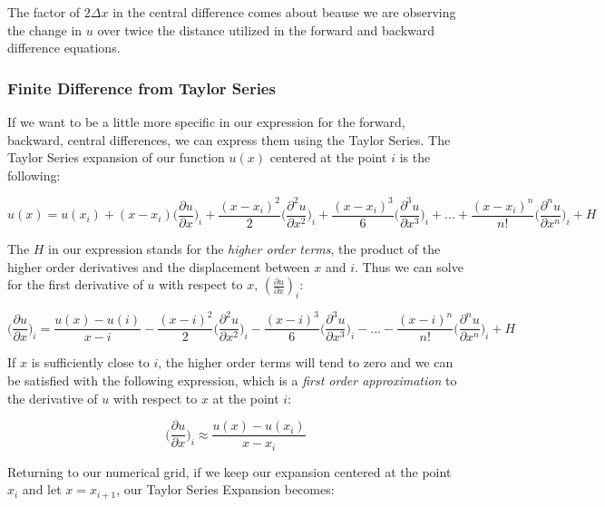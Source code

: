 \documentclass[twocolumn,12pth]{article}
\begin{document}
The factor of $2\Delta{x}$ in the central difference comes about beause we are observing the change in $u$ over twice the distance utilized in the forward and backward difference equations.

\subsubsection{Finite Difference from Taylor Series}
If we want to be a little more specific in our expression for the forward, backward, central differences, we can express them using the Taylor Series.
The Taylor Series expansion of our function $u(x)$ centered at the point $i$ is the following:

\begin{equation}
u(x) = u(x_i) + (x-x_i)\bigg(\frac{\partial{u}}{\partial{x}}\bigg)_i + \frac{(x-x_i)^2}{2}\bigg(\frac{\partial^2{u}}{\partial{x^2}}\bigg)_i + \frac{(x-x_i)^3}{6}\bigg(\frac{\partial^3{u}}{\partial{x^3}}\bigg)_i + ... + \frac{(x-x_i)^n}{n!}\bigg(\frac{\partial^n{u}}{\partial{x^n}}\bigg)_i + H 
\end{equation}

The $H$ in our expression stands for the \textit{higher order terms}, the product of the higher order derivatives and the displacement between $x$ and $i$.
Thus we can solve for the first derivative of $u$ with respect to $x$, $(\frac{\partial{u}}{\partial{x}})_i$:

\begin{equation}
\bigg(\frac{\partial{u}}{\partial{x}}\bigg)_i = \frac{u(x) - u(i)}{x-i}
- \frac{(x-i)^2}{2}\bigg(\frac{\partial^2{u}}{\partial{x^2}}\bigg)_i - \frac{(x-i)^3}{6}\bigg(\frac{\partial^3{u}}{\partial{x^3}}\bigg)_i - ... - \frac{(x-i)^n}{n!}\bigg(\frac{\partial^n{u}}{\partial{x^n}}\bigg)_i + H 
\end{equation}

If $x$ is sufficiently close to $i$, the higher order terms will tend to zero and we can be satisfied with the following expression, which is a \textit{first order approximation} to the derivative of $u$ with respect to $x$ at the point $i$:

\begin{equation}
\bigg(\frac{\partial{u}}{\partial{x}}\bigg)_i \approx \frac{u(x) - u(x_i)}{x-x_i}
\end{equation}

Returning to our numerical grid, if we keep our expansion centered at the point $x_i$ and let $x = x_{i+1}$, our Taylor Series Expansion becomes:
\end{document}
